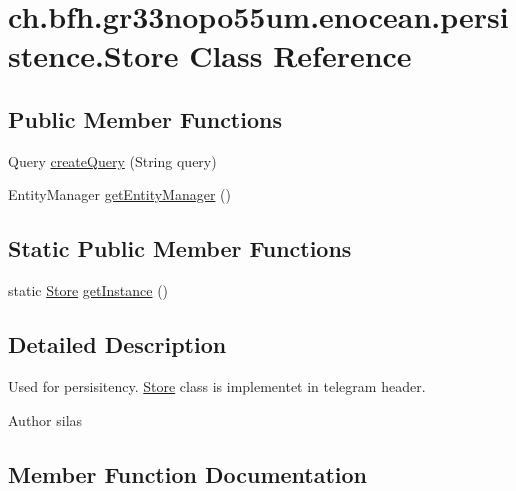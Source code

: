 \hypertarget{classch_1_1bfh_1_1gr33nopo55um_1_1enocean_1_1persistence_1_1_store}{}\section{ch.\+bfh.\+gr33nopo55um.\+enocean.\+persistence.\+Store Class Reference}
\label{classch_1_1bfh_1_1gr33nopo55um_1_1enocean_1_1persistence_1_1_store}
\subsection*{Public Member Functions}
\begin{DoxyCompactItemize}
\item 
Query \hyperlink{classch_1_1bfh_1_1gr33nopo55um_1_1enocean_1_1persistence_1_1_store_a8c76605414d600988856c68286a5eb5a}{create\+Query} (String query)
\item 
Entity\+Manager \hyperlink{classch_1_1bfh_1_1gr33nopo55um_1_1enocean_1_1persistence_1_1_store_a198b406b1a720a65eb6c4de3ee9a8181}{get\+Entity\+Manager} ()
\end{DoxyCompactItemize}
\subsection*{Static Public Member Functions}
\begin{DoxyCompactItemize}
\item 
static \hyperlink{classch_1_1bfh_1_1gr33nopo55um_1_1enocean_1_1persistence_1_1_store}{Store} \hyperlink{classch_1_1bfh_1_1gr33nopo55um_1_1enocean_1_1persistence_1_1_store_ae60beff3d45cb4dec657876392e02471}{get\+Instance} ()
\end{DoxyCompactItemize}


\subsection{Detailed Description}
Used for persisitency. \hyperlink{classch_1_1bfh_1_1gr33nopo55um_1_1enocean_1_1persistence_1_1_store}{Store} class is implementet in telegram header.

\begin{DoxyAuthor}{Author}
silas 
\end{DoxyAuthor}


\subsection{Member Function Documentation}
\hypertarget{classch_1_1bfh_1_1gr33nopo55um_1_1enocean_1_1persistence_1_1_store_a8c76605414d600988856c68286a5eb5a}{}\label{classch_1_1bfh_1_1gr33nopo55um_1_1enocean_1_1persistence_1_1_store_a8c76605414d600988856c68286a5eb5a} 
